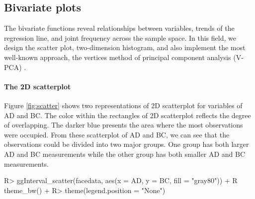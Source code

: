 \documentclass[article]{jss}
\begin{document}
 

\subsection{Bivariate plots}

The bivariate functions reveal relationships between variables, trends of the regression line, and joint frequency across the sample space. In this field, we design the scatter plot, two-dimension histogram, and also implement the most well-known approach, the vertices method of principal component analysis (V-PCA) \cite{cazes1997extension}.




\paragraph{The 2D scatterplot} Figure \ref{fig:scatter} shows
two representations of 2D scatterplot for variables of AD and
BC. The color within the rectangles of 2D scatterplot
reflects the degree of overlapping. The darker blue
presents the area where the most observations were
occupied. From these scatterplot of AD and BC, we can see
that the observations could be divided into two major
groups. One group has both larger AD and BC measurements
while the other group has both smaller AD and BC measurements.
\begin{CodeChunk}
\begin{CodeInput}
R> ggInterval_scatter(facedata, aes(x = AD, y = BC, fill = "gray80")) +
R    theme_bw() +
R>   theme(legend.position = "None")
\end{CodeInput}
\end{CodeChunk}




\end{document}
